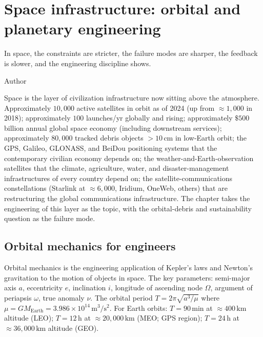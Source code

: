 \chapter{Space infrastructure: orbital and planetary engineering}
\label{vol12:ch10}

\epigraph{In space, the constraints are stricter, the failure modes are sharper, the feedback is slower, and the engineering discipline shows.}{Author}


\noindent
Space is the layer of civilization infrastructure now sitting above the atmosphere. Approximately $10{,}000$ active satellites in orbit as of 2024 (up from $\approx 1{,}000$ in 2018); approximately $100$ launches/yr globally and rising; approximately $\$500$ billion annual global space economy (including downstream services); approximately $80{,}000$ tracked debris objects $>10\,\text{cm}$ in low-Earth orbit; the GPS, Galileo, GLONASS, and BeiDou positioning systems that the contemporary civilian economy depends on; the weather-and-Earth-observation satellites that the climate, agriculture, water, and disaster-management infrastructures of every country depend on; the satellite-communications constellations (Starlink at $\approx 6{,}000$, Iridium, OneWeb, others) that are restructuring the global communications infrastructure. The chapter takes the engineering of this layer as the topic, with the orbital-debris and sustainability question as the failure mode.

\section{Orbital mechanics for engineers}

Orbital mechanics is the engineering application of Kepler's laws and Newton's gravitation to the motion of objects in space. The key parameters: semi-major axis $a$, eccentricity $e$, inclination $i$, longitude of ascending node $\Omega$, argument of periapsis $\omega$, true anomaly $\nu$. The orbital period $T = 2\pi\sqrt{a^3/\mu}$ where $\mu = GM_{\text{Earth}} = 3.986 \times 10^{14}\,\text{m}^3/\text{s}^2$. For Earth orbits: $T = 90\,\text{min}$ at $\approx 400\,\text{km}$ altitude (LEO); $T = 12\,\text{h}$ at $\approx 20{,}000\,\text{km}$ (MEO; GPS region); $T = 24\,\text{h}$ at $\approx 36{,}000\,\text{km}$ altitude (GEO).

